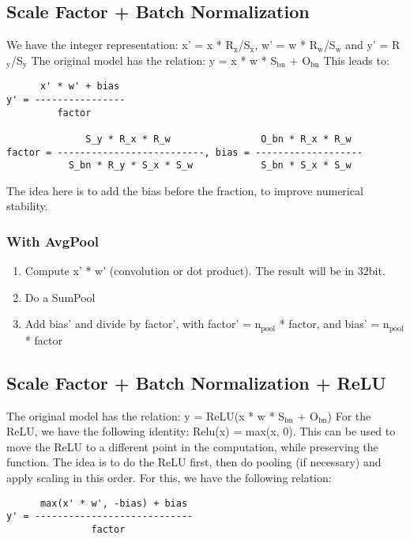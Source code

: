 \documentclass[11pt]{article}
\begin{document}
\subsection{Scale Factor + Batch Normalization}
\label{sec:org0010f9b}
We have the integer representation: x' = x * R\(_{\text{x}}\)/S\(_{\text{x}}\), w' = w * R\(_{\text{w}}\)/S\(_{\text{w}}\) and y' = R\(_{\text{y}}\)/S\(_{\text{y}}\)
The original model has the relation: y = x * w * S\(_{\text{bn}}\) + O\(_{\text{bn}}\)
This leads to:

\begin{verbatim}
      x' * w' + bias
y' = ----------------
         factor

              S_y * R_x * R_w                O_bn * R_x * R_w
factor = --------------------------, bias = -------------------
           S_bn * R_y * S_x * S_w            S_bn * S_x * S_w
\end{verbatim}

The idea here is to add the bias before the fraction, to improve numerical stability.
\subsubsection{With AvgPool}
\label{sec:org780b07e}
\begin{enumerate}
\item Compute x' * w' (convolution or dot product). The result will be in 32bit.
\item Do a SumPool
\item Add bias' and divide by factor', with factor' = n\(_{\text{pool}}\) * factor, and bias' = n\(_{\text{pool}}\) * factor
\end{enumerate}
\subsection{Scale Factor + Batch Normalization + ReLU}
\label{sec:org2b3a9cc}
The original model has the relation: y = ReLU(x * w * S\(_{\text{bn}}\) + O\(_{\text{bn}}\))
For the ReLU, we have the following identity: Relu(x) = max(x, 0). 
This can be used to move the ReLU to a different point in the computation, while preserving the function.
The idea is to do the ReLU first, then do pooling (if necessary) and apply scaling in this order.
For this, we have the following relation:

\begin{verbatim}
      max(x' * w', -bias) + bias
y' = ----------------------------
               factor
\end{verbatim}
\end{document}
